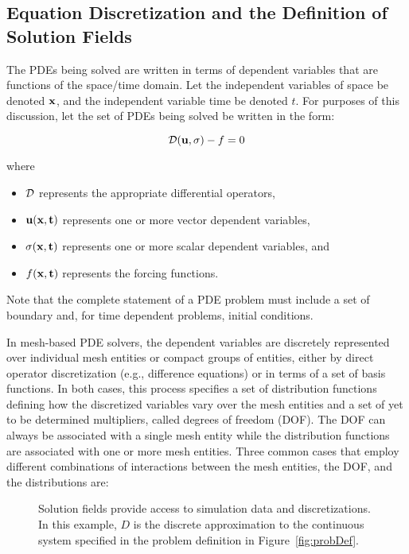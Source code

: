 \subsection{Equation Discretization and the Definition of Solution Fields}\label{sec:pdeDisc}

The PDEs being solved are written in terms of dependent variables that
are functions of the space/time domain. Let the independent variables
of space be denoted ${\bf x}$, and the independent variable time be
denoted $t$.  For purposes of this discussion, let the set of
PDEs being solved be written in the form:

\begin{equation}
{\cal{D}}({\bf u}, \sigma) - f = 0
\end{equation}

where 
\begin{itemize}
\item $\cal{D}$ represents the appropriate differential operators,
\item $\bf{u} (\bf{x},t)$ represents one or more vector dependent variables,
\item $\sigma (\bf{x},t)$ represents one or more scalar dependent variables, and
\item $f (\bf{x},t)$ represents the forcing functions.
\end{itemize}
Note that the complete statement of a PDE problem must include a set
of boundary and, for time dependent problems, initial conditions.

In mesh-based PDE solvers, the dependent variables are discretely
represented over individual mesh entities or compact groups of entities,
either by direct operator discretization (e.g., difference equations) or
in terms of a set of basis functions. In both cases, this process
specifies a set of distribution functions defining how the discretized
variables vary over the mesh entities and a set of yet to be determined
multipliers, called degrees of freedom (DOF). The DOF can always be
associated with a single mesh entity while the distribution functions
are associated with one or more mesh entities.  Three common cases that
employ different combinations of interactions between the mesh entities,
the DOF, and the distributions are:
\begin{figure}
\begin{center}
\caption{Solution fields provide access to simulation data and
discretizations.  In this example, $D$ is the discrete approximation
to the continuous system specified in the problem definition in
Figure~\ref{fig:probDef}.}
\label{fig:fields}
\end{center}
\end{figure}


